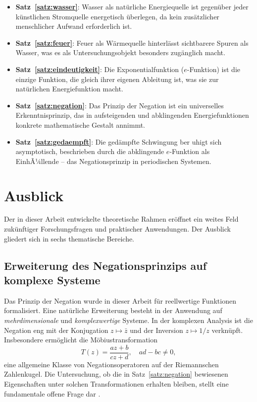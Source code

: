 ﻿\documentclass[a4paper,12pt]{article}
\theoremstyle{definition}
\begin{document}
\begin{itemize}
    \item \textbf{Satz~\ref{satz:wasser}}: Wasser als nat\"urliche Energiequelle ist
          gegen\"uber jeder k\"unstlichen Stromquelle energetisch \"uberlegen, da kein
          zus\"atzlicher menschlicher Aufwand erforderlich ist.
    \item \textbf{Satz~\ref{satz:feuer}}: Feuer als W\"armequelle hinterl\"asst
          sichtbarere Spuren als Wasser, was es als Untersuchungsobjekt besonders
          zug\"anglich macht.
    \item \textbf{Satz~\ref{satz:eindeutigkeit}}: Die Exponentialfunktion ($e$-Funktion)
          ist die einzige Funktion, die gleich ihrer eigenen Ableitung ist, was sie
          zur nat\"urlichen Energiefunktion macht.
    \item \textbf{Satz~\ref{satz:negation}}: Das Prinzip der Negation ist ein
          universelles Erkenntnisprinzip, das in aufsteigenden und abklingenden
          Energiefunktionen konkrete mathematische Gestalt annimmt.
    \item \textbf{Satz~\ref{satz:gedaempft}}: Die ged\"ampfte Schwingung ber uhigt
          sich asymptotisch, beschrieben durch die abklingende $e$-Funktion als
          EinhÃ¼llende -- das Negationsprinzip in periodischen Systemen.
\end{itemize}

\section{Ausblick}
\label{sec:ausblick}

Der in dieser Arbeit entwickelte theoretische Rahmen er\"offnet ein weites Feld
zuk\"unftiger Forschungsfragen und praktischer Anwendungen. Der Ausblick gliedert
sich in sechs thematische Bereiche.

\subsection{Erweiterung des Negationsprinzips auf komplexe Systeme}

Das Prinzip der Negation wurde in dieser Arbeit f\"ur reellwertige Funktionen
formalisiert. Eine nat\"urliche Erweiterung besteht in der Anwendung auf
\emph{mehrdimensionale} und \emph{komplexwertige} Systeme. In der komplexen
Analysis ist die Negation eng mit der Konjugation $z \mapsto \bar{z}$ und der
Inversion $z \mapsto 1/z$ verkn\"upft. Insbesondere erm\"oglicht die M\"obiustransformation
\[
    T(z) = \frac{az + b}{cz + d}, \quad ad - bc \neq 0,
\]
eine allgemeine Klasse von Negationsoperatoren auf der Riemannschen Zahlenkugel.
Die Untersuchung, ob die in Satz~\ref{satz:negation} bewiesenen Eigenschaften
unter solchen Transformationen erhalten bleiben, stellt eine fundamentale offene
Frage dar \cite{Needham1997}.
\end{document}
